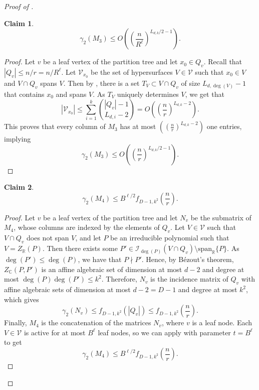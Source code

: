 \documentclass[10pt,a4paper]{amsart}
\newtheorem{claim}{Claim}
\begin{document}
\begin{proof}[Proof of ]
		\begin{claim}
			$$\gamma_2(M_3)\leq O\left(\left(\frac{n}{R^{\ell}}\right)^{L_{d,k}/2-1}\right).$$
		\end{claim}
		\begin{proof}
			Let $v$ be a leaf vertex of the partition tree and let $x_0\in Q_v$. Recall that $|Q_v|\leq n/r=n/R^{\ell}$. Let $\mathcal{V}_{x_0}$ be the set of hypersurfaces $V\in \mathcal{V}$ such that $x_0\in V$ and $V\cap Q_v$ spans $V$. Then by , there is a set $T_V\subset V\cap Q_v$ of size $L_{d,\deg(V)}-1$ that contains $x_0$ and spans $V$. As $T_V$ uniquely determines $V$, we get that 
			$$|\mathcal{V}_{x_0}|\leq \sum_{i=1}^k \binom{|Q_v|-1}{L_{d,i}-2}=O\left(\left(\frac{n}{r}\right)^{L_{d,k}-2}\right).$$
			This proves that every column of $M_3$ has at most $\left(\left(\frac{n}{r}\right)^{L_{d,k}-2}\right)$ one entries, implying
			$$\gamma_2(M_3)\leq O\left(\left(\frac{n}{r}\right)^{L_{d,k}/2-1}\right).$$
		\end{proof}
		
		\begin{claim}
			$$\gamma_2(M_4)\leq B^{\ell/2}f_{D-1,k^2}\left(\frac{n}{r}\right).$$
		\end{claim}
		
		\begin{proof}
			Let $v$ be a leaf vertex of the partition tree and let $N_v$ be the submatrix of $M_4$, whose columns are indexed by the elements of $Q_v$. Let $V\in \mathcal{V}$ such that $V\cap Q_v$ does not span $V$, and let $P$ be an irreducible polynomial such that $V=Z_{\mathbb{R}}(P)$. Then there exists some $P'\in \mathcal{I}_{\deg(P)}(V\cap Q_v)\setminus \text{span}_{\mathbb{R}}\{P\}$. As $\deg(P')\leq \deg(P)$, we have that $P\nmid P'$. Hence, by B\'ezout's theorem, $Z_{\mathbb{C}}(P,P')$ is an affine algebraic set of dimension at most $d-2$ and degree at most $\deg(P)\deg(P')\leq k^2$. Therefore, $N_v$ is the incidence matrix of $Q_v$ with affine algebraic sets of dimension at most $d-2=D-1$ and degree at most $k^2$, which gives
			$$\gamma_2(N_v)\leq f_{D-1,k^2}(|Q_v|)\leq f_{D-1,k^2}\left(\frac{n}{r}\right).$$
			Finally, $M_4$ is the concatenation of the matrices $N_v$, where $v$ is a leaf node. Each $V\in \mathcal{V}$ is active for at most $B^{\ell}$ leaf nodes, so we can apply  with parameter $t=B^{\ell}$ to get
			$$\gamma_2(M_4)\leq B^{\ell/2}f_{D-1,k^2}\left(\frac{n}{r}\right).$$
		\end{proof}
		

\end{proof}
\end{document}
